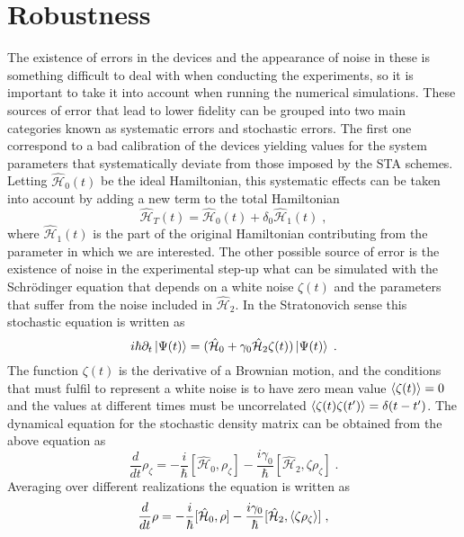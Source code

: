 \section{Robustness}
The existence of errors in the devices and the appearance of noise in these is something difficult to deal with when conducting the experiments, so it is important to take it into account when running the numerical simulations. These sources of error that lead to lower fidelity can be grouped into two main categories known as systematic errors and stochastic errors. The first one correspond to a bad calibration of the devices yielding values for the system parameters that systematically deviate from those imposed by the STA schemes. Letting $\hat{\mathcal{H}}_0(t)$ be the ideal Hamiltonian, this systematic effects can be taken into account by adding a new term to the total Hamiltonian
\begin{equation}
	\hat{\mathcal{H}}_T(t)=\hat{\mathcal{H}}_0(t)+\delta_0\hat{\mathcal{H}}_1(t)\; ,
\end{equation}
where $\hat{\mathcal{H}}_1(t)$ is the part of the original Hamiltonian contributing from the parameter in which we are interested. The other possible source of error is the existence of noise in the experimental step-up what can be simulated with the Schrödinger equation that depends on a white noise $\zeta(t)$ and the parameters that suffer from the noise included in $\hat{\mathcal{H}}_2$. In the Stratonovich sense this stochastic equation is written as
\begin{equation}
	i\hbar \partial_t\ket{\Psi(t)}=(\hat{\mathcal{H}}_0+\gamma_0\hat{\mathcal{H}}_2\zeta(t))\ket{\Psi(t)}\; .
\end{equation}
The function $\zeta(t)$ is the derivative of a Brownian motion, and the conditions that must fulfil to represent a white noise is to have zero mean value $\expval{\zeta(t)}=0$ and the values at different times must be uncorrelated $\expval{\zeta(t)\zeta(t')}=\delta(t-t')$. The dynamical equation for the stochastic density matrix can be obtained from the above equation as
\begin{equation}
	\frac{d}{dt}\rho_\zeta=-\frac{i}{\hbar}[\hat{\mathcal{H}}_0,\rho_\zeta]-\frac{i\gamma_0}{\hbar}[\hat{\mathcal{H}}_2,\zeta\rho_\zeta]\; .
	\label{eq:stochastic_dynamics}
\end{equation}
Averaging over different realizations the equation is written as
\begin{equation}
	\frac{d}{dt}\rho=-\frac{i}{\hbar}[\hat{\mathcal{H}}_0,\rho]-\frac{i\gamma_0}{\hbar}[\hat{\mathcal{H}}_2,\expval{\zeta\rho_\zeta}]\; ,
	\label{eq:almost_dynamic_eq}
\end{equation}
